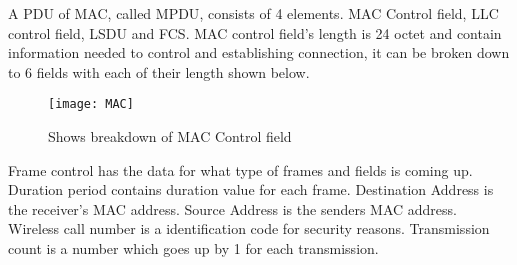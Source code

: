 A \acrshort{PDU} of \acrshort{MAC}, called \acrfull{MPDU}, consists of 4 elements. \acrshort{MAC} Control field, \acrshort{LLC} control field, \acrfull{LSDU} and \acrfull{FCS}.
\acrshort{MAC} control field's length is 24 octet and contain information needed to control and establishing connection, it can be broken down to 6 fields with each of their length shown below.
\begin{figure}
    \centering
    \texttt{[image: MAC]}
    \caption{Shows breakdown of \acrshort{MAC} Control field}
    \label{fig:MAC}
\end{figure}

Frame control has the data for what type of frames and fields is coming up. Duration period contains duration value for each frame. Destination Address is the receiver's \acrshort{MAC} address. Source Address is the senders MAC address. Wireless call number is a identification code for security reasons. Transmission count is a number which goes up by 1 for each transmission. 

